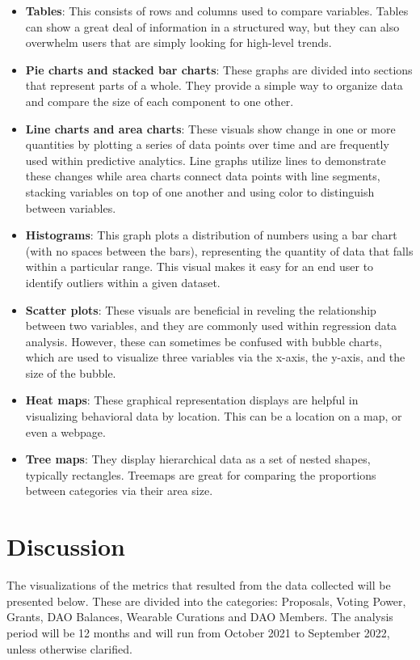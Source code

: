 \documentclass[MSE,Master,english]{twbook}%
\begin{document}
\begin{itemize}
  \item \textbf{Tables}: This consists of rows and columns used to compare variables. Tables can show a great deal of information in a structured way, but they can also overwhelm users that are simply looking for high-level trends.
  \item \textbf{Pie charts and stacked bar charts}: These graphs are divided into sections that represent parts of a whole. They provide a simple way to organize data and compare the size of each component to one other.
  \item \textbf{Line charts and area charts}: These visuals show change in one or more quantities by plotting a series of data points over time and are frequently used within predictive analytics. Line graphs utilize lines to demonstrate these changes while area charts connect data points with line segments, stacking variables on top of one another and using color to distinguish between variables.
  \item \textbf{Histograms}: This graph plots a distribution of numbers using a bar chart (with no spaces between the bars), representing the quantity of data that falls within a particular range. This visual makes it easy for an end user to identify outliers within a given dataset.
  \item \textbf{Scatter plots}: These visuals are beneficial in reveling the relationship between two variables, and they are commonly used within regression data analysis. However, these can sometimes be confused with bubble charts, which are used to visualize three variables via the x-axis, the y-axis, and the size of the bubble.
  \item \textbf{Heat maps}: These graphical representation displays are helpful in visualizing behavioral data by location. This can be a location on a map, or even a webpage.
  \item \textbf{Tree maps}: They display hierarchical data as a set of nested shapes, typically rectangles. Treemaps are great for comparing the proportions between categories via their area size.
\end{itemize}

\chapter{Discussion}
The visualizations of the metrics that resulted from the data collected will be presented below. These are divided into the categories: Proposals, Voting Power, Grants, DAO Balances, Wearable Curations and DAO Members. The analysis period will be 12 months and will run from October 2021 to September 2022, unless otherwise clarified.
\end{document}
